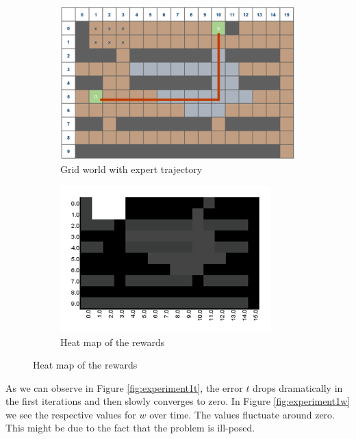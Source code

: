 \documentclass[10pt,a4paper,twocolumn]{article}
\begin{document}
\begin{figure}[h]
\begin{subfigure}[b]{0.5\textwidth}
	\includegraphics[width=\textwidth]{experiment_1_gridworld}
	\caption{Grid world with expert trajectory}
	\label{fig:experiment1trajectory}
\end{subfigure}
\begin{subfigure}[b]{0.5\textwidth}
	\includegraphics[width=\textwidth]{experiment_1_heatmap}
	\caption{Heat map of the rewards}
	\label{fig:experiment1heatmap}
\end{subfigure}
\end{figure}

As we can observe in Figure \ref{fig:experiment1t}, the error $t$ drops dramatically in the first iterations and then slowly converges to zero. In Figure \ref{fig:experiment1w} we see the respective values for $w$ over time. The values fluctuate around zero. This might be due to the fact that the problem is ill-posed.
\end{document}
